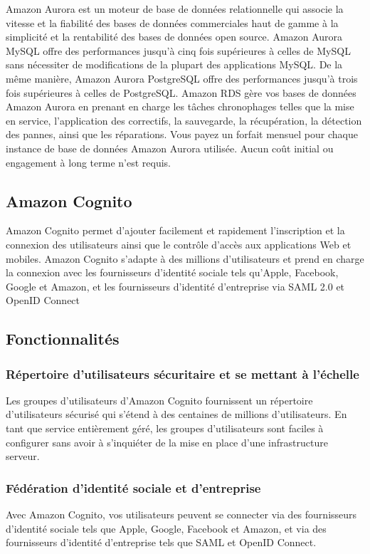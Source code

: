 Amazon Aurora est un moteur de base de données relationnelle qui associe la vitesse et la fiabilité des bases
de données commerciales haut de gamme à la simplicité et la rentabilité des bases de données open source.
Amazon Aurora MySQL offre des performances jusqu’à cinq fois supérieures à celles de MySQL sans
nécessiter de modifications de la plupart des applications MySQL. De la même manière, Amazon Aurora
PostgreSQL offre des performances jusqu’à trois fois supérieures à celles de PostgreSQL. Amazon RDS
gère vos bases de données Amazon Aurora en prenant en charge les tâches chronophages telles que la mise en service, l’application des correctifs, la sauvegarde, la récupération, la détection des pannes, ainsi que
les réparations. Vous payez un forfait mensuel pour chaque instance de base de données Amazon Aurora
utilisée. Aucun coût initial ou engagement à long terme n’est requis.

\subsection{Amazon Cognito}
Amazon Cognito permet d’ajouter facilement et rapidement l’inscription et la connexion des utilisateurs
ainsi que le contrôle d’accès aux applications Web et mobiles. Amazon Cognito s’adapte à des millions
d’utilisateurs et prend en charge la connexion avec les fournisseurs d’identité sociale tels qu’Apple, Facebook, Google et Amazon, et les fournisseurs d’identité d’entreprise via SAML 2.0 et OpenID Connect

\subsection{Fonctionnalités}
\subsubsection{Répertoire d’utilisateurs sécuritaire et se mettant à l’échelle}
Les groupes d’utilisateurs d’Amazon Cognito fournissent un répertoire d’utilisateurs sécurisé qui s’étend à
des centaines de millions d’utilisateurs. En tant que service entièrement géré, les groupes d’utilisateurs sont
faciles à configurer sans avoir à s’inquiéter de la mise en place d’une infrastructure serveur.
\subsubsection{Fédération d’identité sociale et d’entreprise}
Avec Amazon Cognito, vos utilisateurs peuvent se connecter via des fournisseurs d’identité sociale tels
que Apple, Google, Facebook et Amazon, et via des fournisseurs d’identité d’entreprise tels que SAML et
OpenID Connect.
